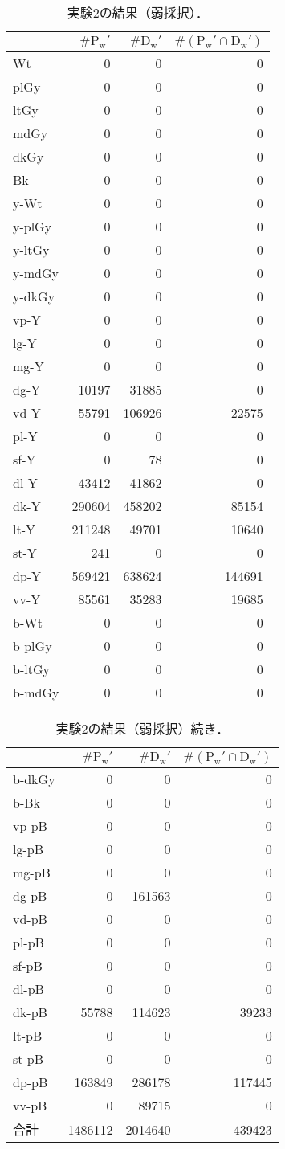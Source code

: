 \documentclass[uplatex,paper=a4,fontsize=4.0truemm,jafontsize=4.0truemm,head_space=30.0truemm,foot_space=30.0truemm,baselineskip=8.0truemm,line_length=40zw,gutter=25.0truemm,oneside,openany,fleqn,hanging_panctuation,open_bracket_pos=nibu_tentsuki,dvipdfmx,jis2004,book,titlepage]{jlreq}
\theoremstyle{mystyle}
\newcommand{\zwspace}{\hspace{1zw}\relax}
\newcommand{\captiondot}[1]{\caption{#1．}}
\newcommand{\tableinput}[4]{\begin{table}[btp]\centering\captiondot{#3}\label{tab:#4}\begin{tabular}{#1}#2\end{tabular}\end{table}}
\newcommand{\parentheses}[1]{\left(#1\right)}
\begin{document}
			\tableinput{l|rrr}{ & \(\#\textrm{P}_\textrm{w}'\) & \(\#\textrm{D}_\textrm{w}'\) & \(\#\parentheses{\textrm{P}_\textrm{w}'\cap\textrm{D}_\textrm{w}'}\) \\ \hline
				Wt & 0 & 0 & 0 \\
				plGy & 0 & 0 & 0 \\
				ltGy & 0 & 0 & 0 \\
				mdGy & 0 & 0 & 0 \\
				dkGy & 0 & 0 & 0 \\
				Bk & 0 & 0 & 0 \\
				y-Wt & 0 & 0 & 0 \\
				y-plGy & 0 & 0 & 0 \\
				y-ltGy & 0 & 0 & 0 \\
				y-mdGy & 0 & 0 & 0 \\
				y-dkGy & 0 & 0 & 0 \\
				vp-Y & 0 & 0 & 0 \\
				lg-Y & 0 & 0 & 0 \\
				mg-Y & 0 & 0 & 0 \\
				dg-Y & 10197 & 31885 & 0 \\
				vd-Y & 55791 & 106926 & 22575 \\
				pl-Y & 0 & 0 & 0 \\
				sf-Y & 0 & 78 & 0 \\
				dl-Y & 43412 & 41862 & 0 \\
				dk-Y & 290604 & 458202 & 85154 \\
				lt-Y & 211248 & 49701 & 10640 \\
				st-Y & 241 & 0 & 0 \\
				dp-Y & 569421 & 638624 & 144691 \\
				vv-Y & 85561 & 35283 & 19685 \\
				b-Wt & 0 & 0 & 0 \\
				b-plGy & 0 & 0 & 0 \\
				b-ltGy & 0 & 0 & 0 \\
				b-mdGy & 0 & 0 & 0}{実験2の結果（弱採択）}{result23}
			\tableinput{l|rrr}{ & \(\#\textrm{P}_\textrm{w}'\) & \(\#\textrm{D}_\textrm{w}'\) & \(\#\parentheses{\textrm{P}_\textrm{w}'\cap\textrm{D}_\textrm{w}'}\) \\ \hline
				b-dkGy & 0 & 0 & 0 \\
				b-Bk & 0 & 0 & 0 \\
				vp-pB & 0 & 0 & 0 \\
				lg-pB & 0 & 0 & 0 \\
				mg-pB & 0 & 0 & 0 \\
				dg-pB & 0 & 161563 & 0 \\
				vd-pB & 0 & 0 & 0 \\
				pl-pB & 0 & 0 & 0 \\
				sf-pB & 0 & 0 & 0 \\
				dl-pB & 0 & 0 & 0 \\
				dk-pB & 55788 & 114623 & 39233 \\
				lt-pB & 0 & 0 & 0 \\
				st-pB & 0 & 0 & 0 \\
				dp-pB & 163849 & 286178 & 117445 \\
				vv-pB & 0 & 89715 & 0 \\ \hline
				合計 & 1486112 & 2014640 & 439423}{実験2の結果（弱採択）\zwspace 続き}{result25}
\end{document}
